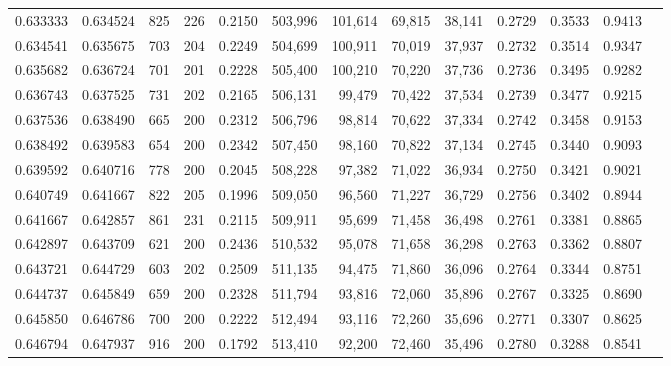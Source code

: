 \begin{tabular}{rrrrrrrrrrrrr}
0.633333 & 0.634524 &    825 &   226 &                                     0.2150 & 503,996 & 101,614 &  69,815 &  38,141 & 0.2729 & 0.3533 & 0.9413 \\
0.634541 & 0.635675 &    703 &   204 &                                     0.2249 & 504,699 & 100,911 &  70,019 &  37,937 & 0.2732 & 0.3514 & 0.9347 \\
0.635682 & 0.636724 &    701 &   201 &                                     0.2228 & 505,400 & 100,210 &  70,220 &  37,736 & 0.2736 & 0.3495 & 0.9282 \\
0.636743 & 0.637525 &    731 &   202 &                                     0.2165 & 506,131 &  99,479 &  70,422 &  37,534 & 0.2739 & 0.3477 & 0.9215 \\
0.637536 & 0.638490 &    665 &   200 &                                     0.2312 & 506,796 &  98,814 &  70,622 &  37,334 & 0.2742 & 0.3458 & 0.9153 \\
0.638492 & 0.639583 &    654 &   200 &                                     0.2342 & 507,450 &  98,160 &  70,822 &  37,134 & 0.2745 & 0.3440 & 0.9093 \\
0.639592 & 0.640716 &    778 &   200 &                                     0.2045 & 508,228 &  97,382 &  71,022 &  36,934 & 0.2750 & 0.3421 & 0.9021 \\
0.640749 & 0.641667 &    822 &   205 &                                     0.1996 & 509,050 &  96,560 &  71,227 &  36,729 & 0.2756 & 0.3402 & 0.8944 \\
0.641667 & 0.642857 &    861 &   231 &                                     0.2115 & 509,911 &  95,699 &  71,458 &  36,498 & 0.2761 & 0.3381 & 0.8865 \\
0.642897 & 0.643709 &    621 &   200 &                                     0.2436 & 510,532 &  95,078 &  71,658 &  36,298 & 0.2763 & 0.3362 & 0.8807 \\
0.643721 & 0.644729 &    603 &   202 &                                     0.2509 & 511,135 &  94,475 &  71,860 &  36,096 & 0.2764 & 0.3344 & 0.8751 \\
0.644737 & 0.645849 &    659 &   200 &                                     0.2328 & 511,794 &  93,816 &  72,060 &  35,896 & 0.2767 & 0.3325 & 0.8690 \\
0.645850 & 0.646786 &    700 &   200 &                                     0.2222 & 512,494 &  93,116 &  72,260 &  35,696 & 0.2771 & 0.3307 & 0.8625 \\
0.646794 & 0.647937 &    916 &   200 &                                     0.1792 & 513,410 &  92,200 &  72,460 &  35,496 & 0.2780 & 0.3288 & 0.8541 \\

\end{tabular}
